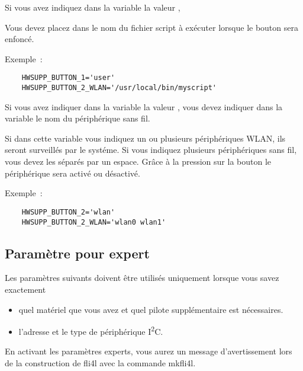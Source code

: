 \begin{description}
  Si vous avez indiquez dans la variable la valeur , 

  Vous devez placez dans  le nom du fichier script à
  exécuter lorsque le bouton sera enfoncé.

  Exemple~:
  \begin{verbatim}
    HWSUPP_BUTTON_1='user'
    HWSUPP_BUTTON_2_WLAN='/usr/local/bin/myscript'
  \end{verbatim}

  Si vous avez indiquer dans la variable la valeur ,
  vous devez indiquer dans la variable  le nom du périphérique
  sans fil.

  Si dans cette variable vous indiquez un ou plusieurs périphériques WLAN, ils seront surveillés
  par le systéme. Si vous indiquez plusieurs périphériques sans fil, vous devez les séparés par
  un espace. Grâce à la pression sur la bouton le périphérique sera activé ou désactivé.

  Exemple~:
  \begin{verbatim}
    HWSUPP_BUTTON_2='wlan'
    HWSUPP_BUTTON_2_WLAN='wlan0 wlan1'
  \end{verbatim}

\subsection{Paramètre pour expert}

  Les paramètres suivants doivent être utilisés uniquement lorsque vous savez exactement
  \begin{itemize}
    \item quel matériel que vous avez et quel pilote supplémentaire est nécessaires.
    \item l'adresse et le type de périphérique I\textsuperscript{2}C\footnotemark.

  \end{itemize}

  En activant les paramètres experts, vous aurez un message d'avertissement lors de
  la construction de fli4l avec la commande mkfli4l.


\end{description}
